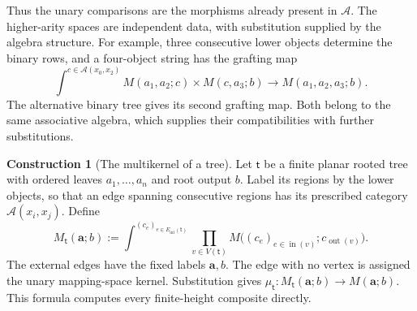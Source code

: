 \documentclass[oneside]{article}
\theoremstyle{plain}
\theoremstyle{definition}
\newtheorem{construction}[theorem]{Construction}
\theoremstyle{remark}
\begin{document}
Thus the unary comparisons are the morphisms already present in
$\mathcal A$. The higher-arity spaces are independent data, with
substitution supplied by the algebra structure. For example,
three consecutive lower objects determine the binary rows, and
a four-object string has the grafting map
\begin{equation}\label{eq:binary-multikernel-grafting}
 \int^{c\in\mathcal A(x_0,x_2)}
 M(a_1,a_2;c)\times M(c,a_3;b)
 \longrightarrow M(a_1,a_2,a_3;b).
\end{equation}
The alternative binary tree gives its second grafting map. Both
belong to the same associative algebra, which supplies their
compatibilities with further substitutions.

\begin{construction}[The multikernel of a tree]
\label{con:tree-multikernel}
Let $\mathsf t$ be a finite planar rooted tree with ordered leaves
$a_1,\ldots,a_n$ and root output $b$. Label its regions by the
lower objects, so that an edge spanning consecutive regions has
its prescribed category $\mathcal A(x_i,x_j)$. Define
\begin{equation}\label{eq:tree-multikernel}
 M_{\mathsf t}(\mathbf a;b)
 :=
 \int^{(c_e)_{e\in E_{\mathrm{int}}(\mathsf t)}}
 \prod_{v\in V(\mathsf t)}
 M\bigl((c_e)_{e\in\operatorname{in}(v)};c_{\operatorname{out}(v)}\bigr).
\end{equation}
The external edges have the fixed labels $\mathbf a,b$.
The edge with no vertex is assigned the unary mapping-space kernel.
Substitution gives
$\mu_{\mathsf t}:M_{\mathsf t}(\mathbf a;b)\to M(\mathbf a;b)$.
This formula computes every finite-height composite directly.
\end{construction}
\end{document}
